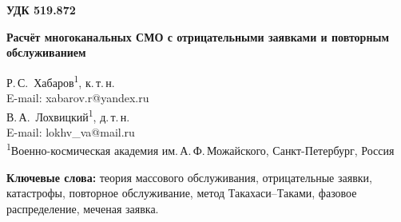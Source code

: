 \documentclass[a4paper,12pt]{article}
\begin{document}
\noindent\textbf{УДК 519.872}
\vspace{1em}

\begin{center}
{\Large\bfseries Расчёт многоканальных СМО с отрицательными заявками и повторным обслуживанием}
\end{center}
\vspace{0.8em}

\begin{center}
Р.\,С.~Хабаров\textsuperscript{1}, к.\,т.\,н.\\[2pt]
E-mail: xabarov.r@yandex.ru\\[6pt]
В.\,А.~Лохвицкий\textsuperscript{1}, д.\,т.\,н.\\[2pt]
E-mail: lokhv\_va@mail.ru\\[8pt]
{\small\textsuperscript{1}Военно-космическая академия им.\,А.\,Ф.\,Можайского, Санкт-Петербург, Россия}
\end{center}
\vspace{0.5em}

\begin{abstract}
Рассматриваются многоканальные системы массового обслуживания с пуассоновскими поступлениями и отрицательными воздействиями. Воздействие затрагивает случайно выбранную обслуживаемую заявку либо все занятые каналы одновременно; исследуются удаление заявок и повторное обслуживание с новой или с первоначально выбранной длительностью. Для удаления и очищения системы длительность обслуживания заменяется гиперэкспоненциальным распределением второго порядка \(H_2\) с теми же первыми тремя моментами, и стационарные вероятности рассчитываются методом Такахаси--Таками; при коэффициенте вариации меньше единицы параметры \(H_2\) могут быть комплексными. Моменты времени ожидания и пребывания меченой заявки находятся из линейных уравнений с учётом изменения числа занятых каналов. Для повторов используется совместная фазовая модель каналов, для сохранённой работы -- её конечная аппроксимация с поправкой погрешности квадратуры по системе без воздействий. Оценена погрешность замены гамма-распределения законом \(H_2\): по среднему ожиданию она не превышает 1,1\% при коэффициенте вариации не менее 0,5. Результаты сопоставлены с имитационным моделированием для нескольких нагрузок, интенсивностей воздействий и чисел каналов.
\end{abstract}
\textbf{Ключевые слова:} теория массового обслуживания, отрицательные заявки, катастрофы, повторное обслуживание, метод Такахаси--Таками, фазовое распределение, меченая заявка.
\end{document}
